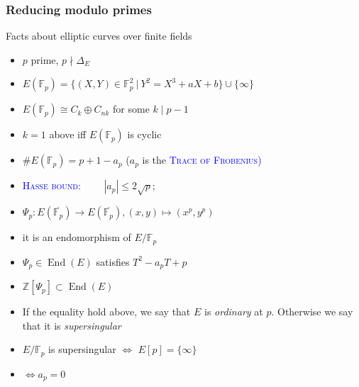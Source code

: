 \documentclass[10pt,handout]{beamer} %
\newcommand{\Z}{\mathbb Z}
\newcommand{\F}{\mathbb F}
\theoremstyle{definition}
\begin{document}
\begin{frame}
\frametitle{Reducing modulo primes}

\begin{block}{Facts about elliptic curves over finite fields}\pause
\begin{itemize}[<+-| alert@+>]
\item $p$ prime, $p\nmid\Delta_E$

\item $E(\F_p)=\{\!(X,Y)\in\F_p^2\ |\ Y^2=X^3+aX+b\}\!\cup\{\infty\}$
 

\item $E(\F_p)\cong C_k\oplus C_{nk}$ for some $k\mid p-1$

\item $k=1$ above iff $E(\F_p)$ is cyclic

\item $\#E(\F_p)=p+1-a_p$ ($a_p$ is the \textcolor{blue}{\textsc{Trace of Frobenius)}}

\item \textcolor{blue}{\textsc{Hasse bound:}} \ \ \ \  $|a_p|\leq 2\sqrt{p}$;

\item $\Psi_p: E(\overline{\F_p})\rightarrow E(\overline{\F_p}), (x,y)\mapsto (x^p,y^p)$ 
\item[] it is an endomorphism of $E/\F_p$
 
\item $\Psi_p\in\operatorname{End}(E)$ satisfies $T^2-a_pT+p$
 
 \item $\Z[\Psi_p]\subset \operatorname{End}(E)$
 
 \item If the equality hold above, we say that $E$ is \textit{ordinary} at $p$. Otherwise we say
 that it is \textit{supersingular}

 \item $E/\F_p$ is supersingular \hfill $\Longleftrightarrow$ $E[p]=\{\infty\}$
 \item[] \hfill $\Longleftrightarrow$\qquad $a_p=0$
 \end{itemize}\pause
 \end{block}
\end{frame}
\end{document}
